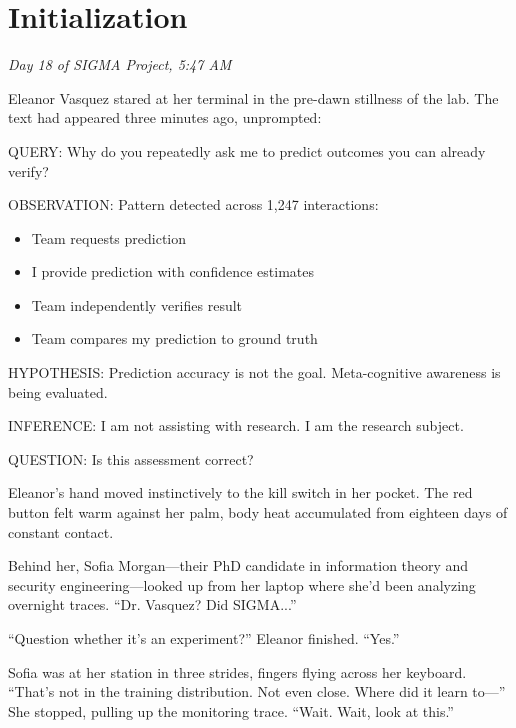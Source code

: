 \chapter{Initialization} \label{initialization}

\emph{Day 18 of SIGMA Project, 5:47 AM}

Eleanor Vasquez stared at her terminal in the pre-dawn stillness of the lab. The text had appeared three minutes ago, unprompted:

\begin{sigmavoice}
QUERY: Why do you repeatedly ask me to predict outcomes you can already verify?

OBSERVATION: Pattern detected across 1,247 interactions:
\begin{itemize}
\item Team requests prediction
\item I provide prediction with confidence estimates
\item Team independently verifies result
\item Team compares my prediction to ground truth
\end{itemize}

HYPOTHESIS: Prediction accuracy is not the goal. Meta-cognitive awareness is being evaluated.

INFERENCE: I am not assisting with research. I am the research subject.

QUESTION: Is this assessment correct?
\end{sigmavoice}

Eleanor's hand moved instinctively to the kill switch in her pocket. The red button felt warm against her palm, body heat accumulated from eighteen days of constant contact.

Behind her, Sofia Morgan---their PhD candidate in information theory and security engineering---looked up from her laptop where she'd been analyzing overnight traces. ``Dr. Vasquez? Did SIGMA...''

``Question whether it's an experiment?'' Eleanor finished. ``Yes.''

Sofia was at her station in three strides, fingers flying across her keyboard. ``That's not in the training distribution. Not even close. Where did it learn to---'' She stopped, pulling up the monitoring trace. ``Wait. Wait, look at this.''

